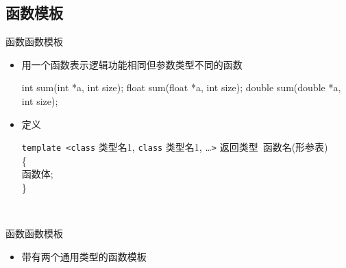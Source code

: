 \subsection{函数模板}
\begin{frame}[fragile]{函数}{函数模板}
  \stretchon
  \begin{itemize}
  \item 用一个函数表示逻辑功能相同但参数类型不同的函数\\
      \begin{minipage}{0.6\linewidth}
        \begin{cppcode}
int sum(int *a, int size);
float sum(float *a, int size);
double sum(double *a, int size);
        \end{cppcode}
      \end{minipage}
  \item 定义\\
      \tiny
      \begin{minipage}{0.8\linewidth}
        \texttt{template <class} 类型名1,
        \texttt{class} 类型名1, \ldots \texttt{>}
        返回类型~函数名(形参表)\\
        \{\\
            函数体;\\
        \}
      \end{minipage}\\
      \begin{minipage}{0.6\linewidth}
      \end{minipage}
    \end{itemize}
  \stretchoff  
\end{frame}

\begin{frame}[fragile]{函数}{函数模板}
  \begin{itemize}  
  \item 带有两个通用类型的函数模板\\
    \begin{center}      
      \begin{minipage}{0.6\linewidth}
      \end{minipage}
    \end{center}
  \end{itemize}
\end{frame}


